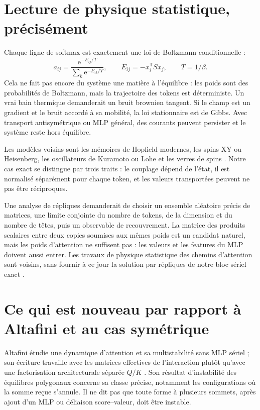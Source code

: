 \documentclass[11pt,a4paper]{article}
\theoremstyle{definition}
\newcommand{\T}{\mathsf T}
\newcommand{\e}{\mathrm e}
\begin{document}
\section{Lecture de physique statistique, précisément}
\label{sec:statphys}

Chaque ligne de softmax est exactement une loi de Boltzmann conditionnelle :
\[
 a_{ij}=\frac{\e^{-E_{ij}/T}}{\sum_k\e^{-E_{ik}/T}},
 \qquad E_{ij}=-x_i^{\T}Sx_j,\qquad T=1/\beta.
\]
Cela ne fait pas encore du système une matière à l'équilibre : les poids sont des
probabilités de Boltzmann, mais la trajectoire des tokens est déterministe. Un vrai bain
thermique demanderait un bruit brownien tangent. Si le champ est un gradient et le
bruit accordé à sa mobilité, la loi stationnaire est de Gibbs. Avec transport
antisymétrique ou MLP général, des courants peuvent persister et le système reste hors
équilibre.

Les modèles voisins sont les mémoires de Hopfield modernes, les spins XY ou Heisenberg,
les oscillateurs de Kuramoto ou Lohe et les verres de spins
\cite{ramsauer2021hopfield,tiberi2024interplay}. Notre cas exact se distingue par trois
traits : le couplage dépend de l'état, il est normalisé séparément pour chaque token,
et les valeurs transportées peuvent ne pas être réciproques.

Une analyse de répliques demanderait de choisir un ensemble aléatoire précis de
matrices, une limite conjointe du nombre de tokens, de la dimension et du nombre de
têtes, puis un observable de recouvrement. La matrice des produits scalaires entre deux
copies soumises aux mêmes poids est un candidat naturel, mais les poids d'attention ne
suffisent pas : les valeurs et les features du MLP doivent aussi entrer. Les travaux de
physique statistique des chemins d'attention sont voisins, sans fournir à ce jour la
solution par répliques de notre bloc sériel exact \cite{tiberi2024interplay}.

\section{Ce qui est nouveau par rapport à Altafini et au cas symétrique}
\label{sec:new}

Altafini étudie une dynamique d'attention et sa multistabilité sans MLP sériel ; son
écriture travaille avec les matrices effectives de l'interaction plutôt qu'avec une
factorisation architecturale séparée $Q/K$ \cite{altafini2025multistability}. Son
résultat d'instabilité des équilibres polygonaux concerne sa classe précise, notamment
les configurations où la somme reçue s'annule. Il ne dit pas que toute forme à plusieurs
sommets, après ajout d'un MLP ou déliaison score--valeur, doit être instable.
\end{document}
